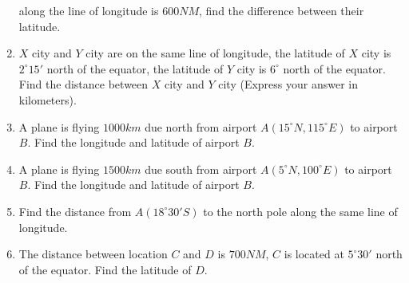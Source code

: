 \documentclass{report}
\begin{document}
\begin{multicols*}{2}
\begin{enumerate}
              along the line of longitude is $600NM$, find the difference between their
              latitude.
        \item $X$ city and $Y$ city are on the same line of longitude, the latitude of $X$ city is $2^\circ 15'$ north of the equator, the latitude of $Y$ city is $6^\circ$ north of the equator. Find the distance between $X$ city and $Y$ city (Express your answer in kilometers).
        \item A plane is flying $1000km$ due north from airport $A(15^\circ N, 115^\circ E)$
              to airport $B$. Find the longitude and latitude of airport $B$.
        \item A plane is flying $1500km$ due south from airport $A(5^\circ N, 100^\circ E)$
              to airport $B$. Find the longitude and latitude of airport $B$.
        \item Find the distance from $A(18^\circ 30' S)$ to the north pole along the same
              line of longitude.
        \item The distance between location $C$ and $D$ is $700NM$, $C$ is located at
              $5^\circ 30'$ north of the equator. Find the latitude of $D$.
    \end{enumerate}
\end{multicols*}
\end{document}
